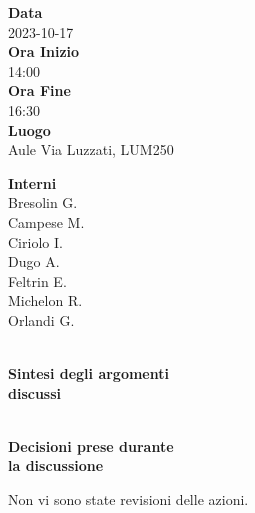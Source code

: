 \documentclass{article}
\begin{document}
\setlength{\columnsep}{2.2em}
\setlength{\columnseprule}{4pt}
\begin{paracol}{2}


\textbf{Data} \\
2023-10-17\\

\textbf{Ora Inizio} \\
14:00\\

\textbf{Ora Fine} \\
16:30\\

\textbf{Luogo} \\
Aule Via Luzzati, LUM250

\vspace{6em}


\textbf{Interni} \\
Bresolin G.\\
Campese M.\\
Ciriolo I.\\
Dugo A.\\
Feltrin E.\\
Michelon R.\\
Orlandi G.\\


\newpage

\\
\textbf{Sintesi degli argomenti\\discussi}

\newpage

\\
\textbf{Decisioni prese durante\\la discussione}

\switchcolumn


\begin{enumerate}
Non vi sono state revisioni delle azioni.
\end{enumerate}

\vspace{19,8em}


\end{paracol}
\end{document}
